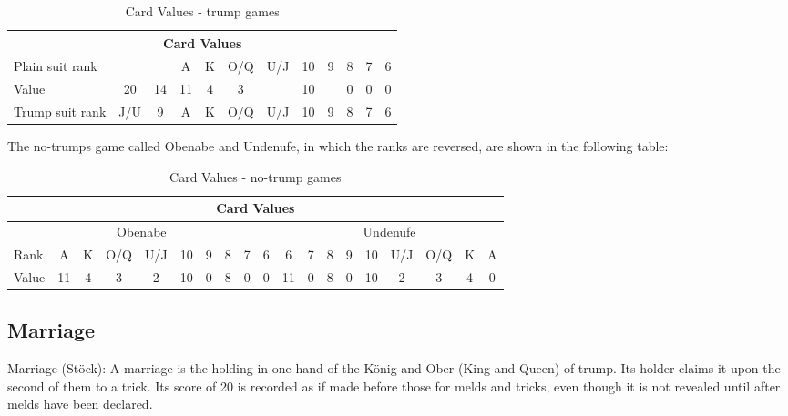 \begin{table}[ht!]
    \caption{Card Values - trump games}
    \label{tab:Card Values - trump games}
    \begin{center}
        \begin{tabular}{|l|c|c|c|c|c|c|c|c|c|c|c|}
             \hline
             \multicolumn{12}{|c|}{\textbf{Card Values}} \\ \hline
             Plain suit rank & & & A & K & O/Q & U/J & 10 & 9 & 8 & 7 & 6 \\ \hline
             Value & 20 &  14 & 11 & 4 & 3 &   & 10 &   & 0 & 0 & 0 \\ \hline
             Trump suit rank & J/U & 9 & A & K & O/Q & U/J & 10 & 9 & 8 & 7 & 6 \\ \hline
        \end{tabular}
    \end{center}
\end{table}

The no-trumps game called Obenabe and Undenufe, in which the ranks are reversed, are shown in the following table:
\begin{table}[ht!]
    \caption{Card Values - no-trump games}
    \label{tab:Card Values - no-trump games}
    \begin{center}
        \begin{tabular}{|l|c|c|c|c|c|c|c|c|c||c|c|c|c|c|c|c|c|c|}
             \hline
             \multicolumn{19}{|c|}{\textbf{Card Values}} \\ \hline
             \multicolumn{10}{|c||}{Obenabe} & \multicolumn{9}{c|}{Undenufe} \\ \hline
             Rank & A & K & O/Q & U/J & 10 & 9 & 8 & 7 & 6 & 6 & 7 & 8 & 9 & 10 & U/J & O/Q & K & A  \\ \hline
             Value & 11 & 4 & 3 & 2 & 10 & 0 & 8 & 0 & 0 & 11 & 0 & 8 & 0 & 10 & 2 & 3 & 4 & 0 \\ \hline
        \end{tabular}
    \end{center}
\end{table}


\subsection{Marriage}
Marriage (Stöck): A marriage is the holding in one hand of the König and Ober (King and Queen) of trump. Its holder claims it upon the second of them to a trick. Its score of 20 is recorded as if made before those for melds and tricks, even though it is not revealed until after melds have been declared.

